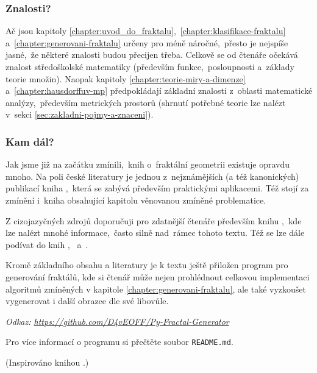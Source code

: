 \subsubsection{Znalosti?}

Ač jsou kapitoly \ref{chapter:uvod_do_fraktalu},~\ref{chapter:klasifikace-fraktalu} a~\ref{chapter:generovani-fraktalu} určeny pro méně náročné,~přesto je nejspíše jasné,~že některé znalosti budou přecijen třeba. Celkově se od čtenáře očekává znalost středoškolské matematiky (především funkce,~posloupnosti a~základy teorie množin). Naopak kapitoly \ref{chapter:teorie-miry-a-dimenze} a~\ref{chapter:hausdorffuv-mp} předpokládají základní znalosti z~oblasti matematické analýzy,~především metrických prostorů (shrnutí potřebné teorie lze nalézt v~sekci \ref{sec:zakladni-pojmy-a-znaceni}).

\subsubsection{Kam dál?}

Jak jsme již na začátku zmínili,~knih o~fraktální geometrii existuje opravdu mnoho. Na poli české literatury je jednou z~nejznámějších (a též kanonických) publikací kniha \cite{Zelinka2006},~která se zabývá především praktickými aplikacemi. Též stojí za zmínění i~kniha \cite{Voracova2022} obsahující kapitolu věnovanou zmíněné problematice.

Z cizojazyčných zdrojů doporučuji pro zdatnější čtenáře především knihu \cite{Falconer1989},~kde lze nalézt mnohé informace,~často silně nad~rámec tohoto textu. Též se lze dále podívat do knih \cite{Prusinkiewicz1990},~\cite{Edgar2008} a~\cite{Mattila1995}.

Kromě základního obsahu a literatury je k textu ještě přiložen program pro generování fraktálů, kde si čtenář může nejen prohlédnout celkovou implementaci algoritmů zmíněných v kapitole \ref{chapter:generovani-fraktalu}, ale také vyzkoušet vygenerovat i další obrazce dle své libovůle.

\textit{Odkaz: \url{https://github.com/D4vEOFF/Py-Fractal-Generator}}

Pro více informací o programu si přečtěte soubor \texttt{README.md}.

(Inspirováno knihou \cite{Hladik2019}.)